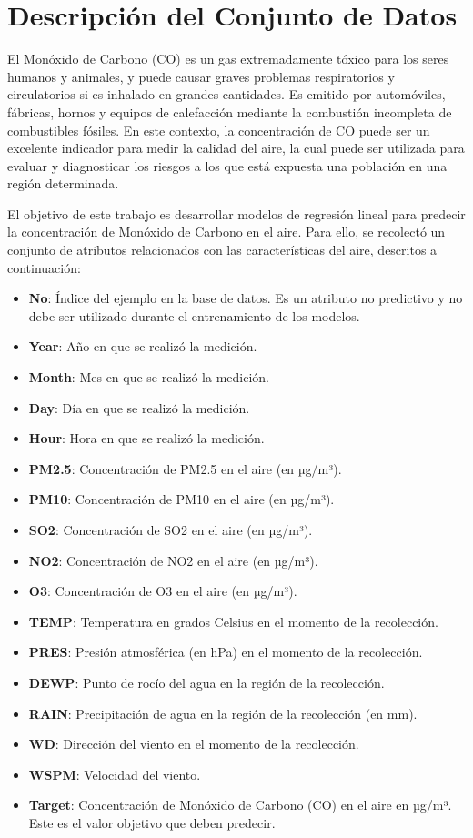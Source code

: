 
\section{Descripción del Conjunto de Datos}

El Monóxido de Carbono (CO) es un gas extremadamente tóxico para los seres humanos y animales, y puede causar graves problemas respiratorios y circulatorios si es inhalado en grandes cantidades. Es emitido por automóviles, fábricas, hornos y equipos de calefacción mediante la combustión incompleta de combustibles fósiles. En este contexto, la concentración de CO puede ser un excelente indicador para medir la calidad del aire, la cual puede ser utilizada para evaluar y diagnosticar los riesgos a los que está expuesta una población en una región determinada.

El objetivo de este trabajo es desarrollar modelos de regresión lineal para predecir la concentración de Monóxido de Carbono en el aire. Para ello, se recolectó un conjunto de atributos relacionados con las características del aire, descritos a continuación:

\begin{itemize}
    \item \textbf{No}: Índice del ejemplo en la base de datos. Es un atributo no predictivo y no debe ser utilizado durante el entrenamiento de los modelos.
    \item \textbf{Year}: Año en que se realizó la medición.
    \item \textbf{Month}: Mes en que se realizó la medición.
    \item \textbf{Day}: Día en que se realizó la medición.
    \item \textbf{Hour}: Hora en que se realizó la medición.
    \item \textbf{PM2.5}: Concentración de PM2.5 en el aire (en µg/m³).
    \item \textbf{PM10}: Concentración de PM10 en el aire (en µg/m³).
    \item \textbf{SO2}: Concentración de SO2 en el aire (en µg/m³).
    \item \textbf{NO2}: Concentración de NO2 en el aire (en µg/m³).
    \item \textbf{O3}: Concentración de O3 en el aire (en µg/m³).
    \item \textbf{TEMP}: Temperatura en grados Celsius en el momento de la recolección.
    \item \textbf{PRES}: Presión atmosférica (en hPa) en el momento de la recolección.
    \item \textbf{DEWP}: Punto de rocío del agua en la región de la recolección.
    \item \textbf{RAIN}: Precipitación de agua en la región de la recolección (en mm).
    \item \textbf{WD}: Dirección del viento en el momento de la recolección.
    \item \textbf{WSPM}: Velocidad del viento.
    \item \textbf{Target}: Concentración de Monóxido de Carbono (CO) en el aire en µg/m³. Este es el valor objetivo que deben predecir.
\end{itemize}

